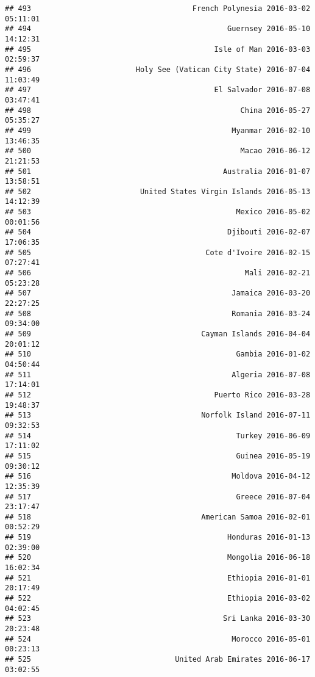 \documentclass[
]{article}
\begin{document}
\begin{verbatim}
## 493                                     French Polynesia 2016-03-02 05:11:01
## 494                                             Guernsey 2016-05-10 14:12:31
## 495                                          Isle of Man 2016-03-03 02:59:37
## 496                        Holy See (Vatican City State) 2016-07-04 11:03:49
## 497                                          El Salvador 2016-07-08 03:47:41
## 498                                                China 2016-05-27 05:35:27
## 499                                              Myanmar 2016-02-10 13:46:35
## 500                                                Macao 2016-06-12 21:21:53
## 501                                            Australia 2016-01-07 13:58:51
## 502                         United States Virgin Islands 2016-05-13 14:12:39
## 503                                               Mexico 2016-05-02 00:01:56
## 504                                             Djibouti 2016-02-07 17:06:35
## 505                                        Cote d'Ivoire 2016-02-15 07:27:41
## 506                                                 Mali 2016-02-21 05:23:28
## 507                                              Jamaica 2016-03-20 22:27:25
## 508                                              Romania 2016-03-24 09:34:00
## 509                                       Cayman Islands 2016-04-04 20:01:12
## 510                                               Gambia 2016-01-02 04:50:44
## 511                                              Algeria 2016-07-08 17:14:01
## 512                                          Puerto Rico 2016-03-28 19:48:37
## 513                                       Norfolk Island 2016-07-11 09:32:53
## 514                                               Turkey 2016-06-09 17:11:02
## 515                                               Guinea 2016-05-19 09:30:12
## 516                                              Moldova 2016-04-12 12:35:39
## 517                                               Greece 2016-07-04 23:17:47
## 518                                       American Samoa 2016-02-01 00:52:29
## 519                                             Honduras 2016-01-13 02:39:00
## 520                                             Mongolia 2016-06-18 16:02:34
## 521                                             Ethiopia 2016-01-01 20:17:49
## 522                                             Ethiopia 2016-03-02 04:02:45
## 523                                            Sri Lanka 2016-03-30 20:23:48
## 524                                              Morocco 2016-05-01 00:23:13
## 525                                 United Arab Emirates 2016-06-17 03:02:55

\end{verbatim}
\end{document}
